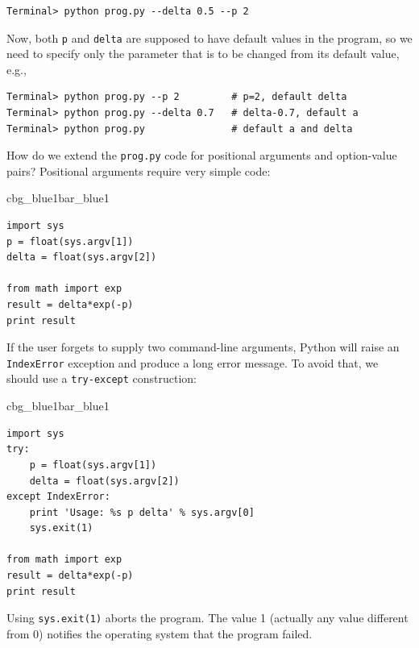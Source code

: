 \documentclass[%
oneside,                 %
final,                   %
10pt]{article}
\newenvironment{_pro_tight}[2]{
   \def\FrameCommand{\color{#2}\vrule width 1mm\normalcolor\colorbox{#1}}
   \FrameRule0.6pt\MakeFramed {\advance\hsize-2mm\FrameRestore}\vskip3mm}
   {\vskip0mm\endMakeFramed}
\newenvironment{pro}[2]{
\bgroup\rmfamily
\fboxsep=0mm\relax
\begin{_pro_tight}{#1}{#2}
\list{}{\parsep=-2mm\parskip=0mm\topsep=0pt\leftmargin=2mm
\rightmargin=2\leftmargin\leftmargin=4pt\relax}
\item\relax}
{\endlist\end{_pro_tight}\egroup}
\begin{document}
\begin{Verbatim}[frame=lines,label=\fbox{{\tiny Terminal}},framesep=2.5mm,framerule=0.7pt,fontsize=\fontsize{9pt}{9pt}]
Terminal> python prog.py --delta 0.5 --p 2
\end{Verbatim}
Now, both \texttt{p} and \texttt{delta} are supposed to have default values in the program,
so we need to specify only the parameter that is to be changed from
its default value, e.g.,

\begin{Verbatim}[frame=lines,label=\fbox{{\tiny Terminal}},framesep=2.5mm,framerule=0.7pt,fontsize=\fontsize{9pt}{9pt}]
Terminal> python prog.py --p 2         # p=2, default delta
Terminal> python prog.py --delta 0.7   # delta-0.7, default a
Terminal> python prog.py               # default a and delta
\end{Verbatim}

How do we extend the \texttt{prog.py} code for positional arguments
and option-value pairs? Positional arguments require very simple
code:

\begin{pro}{cbg_blue1}{bar_blue1}\begin{Verbatim}[numbers=none,fontsize=\fontsize{9pt}{9pt},baselinestretch=0.95,xleftmargin=2mm]
import sys
p = float(sys.argv[1])
delta = float(sys.argv[2])

from math import exp
result = delta*exp(-p)
print result
\end{Verbatim}
\end{pro}
\noindent
If the user forgets to supply two command-line arguments, Python will
raise an \texttt{IndexError} exception and produce a long error message.
To avoid that, we should use a \texttt{try-except} construction:

\begin{pro}{cbg_blue1}{bar_blue1}\begin{Verbatim}[numbers=none,fontsize=\fontsize{9pt}{9pt},baselinestretch=0.95,xleftmargin=2mm]
import sys
try:
    p = float(sys.argv[1])
    delta = float(sys.argv[2])
except IndexError:
    print 'Usage: %s p delta' % sys.argv[0]
    sys.exit(1)

from math import exp
result = delta*exp(-p)
print result
\end{Verbatim}
\end{pro}
\noindent
Using \texttt{sys.exit(1)} aborts the program. The value 1 (actually any
value different from 0) notifies the operating system that the
program failed.
\end{document}
